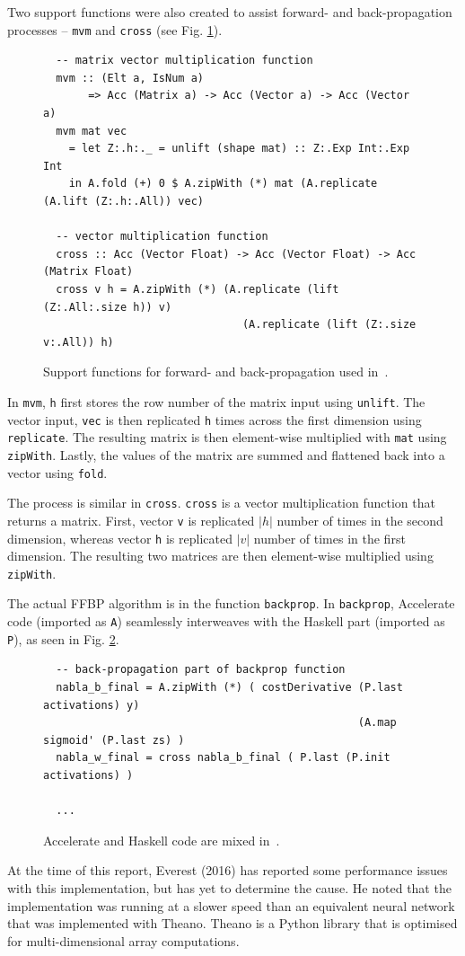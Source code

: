 Two support functions were also created to assist forward- and back-propagation processes -- \texttt{mvm} and \texttt{cross} (see Fig. \ref{fig:acc-functions3}).
\begin{figure}
\begin{lstlisting}
  -- matrix vector multiplication function
  mvm :: (Elt a, IsNum a)
       => Acc (Matrix a) -> Acc (Vector a) -> Acc (Vector a)
  mvm mat vec
    = let Z:.h:._ = unlift (shape mat) :: Z:.Exp Int:.Exp Int
    in A.fold (+) 0 $ A.zipWith (*) mat (A.replicate (A.lift (Z:.h:.All)) vec)
  
  -- vector multiplication function
  cross :: Acc (Vector Float) -> Acc (Vector Float) -> Acc (Matrix Float)
  cross v h = A.zipWith (*) (A.replicate (lift (Z:.All:.size h)) v)
                               (A.replicate (lift (Z:.size v:.All)) h)
\end{lstlisting}
  \caption{Support functions for forward- and back-propagation used in~\cite{Eve16}.}
  \label{fig:acc-functions3}
\end{figure}
In \texttt{mvm}, \texttt{h} first stores the row number of the matrix input using \texttt{unlift}. The vector input, \texttt{vec} is then replicated \texttt{h} times across the first dimension using \texttt{replicate}. The resulting matrix is then element-wise multiplied with \texttt{mat} using \texttt{zipWith}. Lastly, the values of the matrix are summed and flattened back into a vector using \texttt{fold}.

The process is similar in \texttt{cross}. \texttt{cross} is a vector multiplication function that returns a matrix. First, vector \texttt{v} is replicated $|h|$ number of times in the second dimension, whereas vector \texttt{h} is replicated $|v|$ number of times in the first dimension. The resulting two matrices are then element-wise multiplied using \texttt{zipWith}. 

The actual FFBP algorithm is in the function \texttt{backprop}. In \texttt{backprop}, Accelerate code (imported as \texttt{A}) seamlessly interweaves with the Haskell part (imported as \texttt{P}), as seen in Fig. \ref{fig:acc-functions4}.
\begin{figure}
  \begin{lstlisting}
  -- back-propagation part of backprop function
  nabla_b_final = A.zipWith (*) ( costDerivative (P.last activations) y) 
                                                 (A.map sigmoid' (P.last zs) )
  nabla_w_final = cross nabla_b_final ( P.last (P.init activations) )
  
  ...
  \end{lstlisting}
  \caption{Accelerate and Haskell code are mixed in~\cite{Eve16}.}
  \label{fig:acc-functions4}
\end{figure}

At the time of this report, Everest (2016) has reported some performance issues with this implementation, but has yet to determine the cause. He noted that the implementation was running at a slower speed than an equivalent neural network that was implemented with Theano. Theano is a Python library that is optimised for multi-dimensional array computations.
